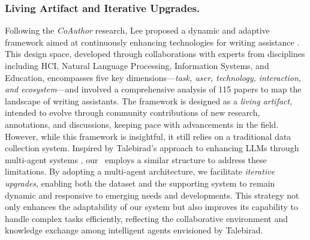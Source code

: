 \subsubsection{Living Artifact and Iterative Upgrades.}
Following the \textit{CoAuthor} research, Lee proposed a dynamic and adaptive framework aimed at continuously enhancing technologies for writing assistance \cite{lee2024design}. This design space, developed through collaborations with experts from disciplines including HCI, Natural Language Processing, Information Systems, and Education, encompasses five key dimensions—\textit{task, user, technology, interaction, and ecosystem}—and involved a comprehensive analysis of 115 papers to map the landscape of writing assistants. The framework is designed as a \textit{living artifact}, intended to evolve through community contributions of new research, annotations, and discussions, keeping pace with advancements in the field. However, while this framework is insightful, it still relies on a traditional data collection system. Inspired by Talebirad's approach to enhancing LLMs through multi-agent systems \cite{talebirad2023multi}, our \dataset~employs a similar structure to address these limitations. By adopting a multi-agent architecture, we facilitate \textit{iterative upgrades}, enabling both the dataset and the supporting system to remain dynamic and responsive to emerging needs and developments. This strategy not only enhances the adaptability of our system but also improves its capability to handle complex tasks efficiently, reflecting the collaborative environment and knowledge exchange among intelligent agents envisioned by Talebirad.